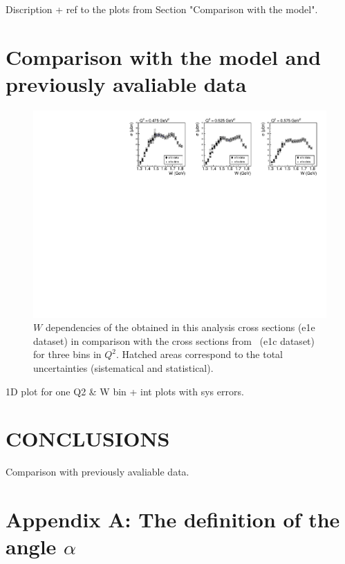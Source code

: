 \documentclass[prc,twocolumn,superscriptaddress,showpacs,amssymb,amsmath,amsfonts,linenumbers,aps]{revtex4-1}
\begin{document}
Discription + ref to the plots from Section "Comparison with the model".

\section{Comparison with the model and previously avaliable data}

\begin{figure}[htp]
\begin{center}
\includegraphics[width=12cm]{pictures/conclusions/e1e_e1c.pdf}
\caption{\small $W$ dependencies of the obtained in this analysis  cross sections (e1e dataset) in comparison with the cross sections from~\cite{Fedotov:2008aa} (e1c dataset) for three bins in $Q^{2}$. Hatched areas correspond to the total uncertainties (sistematical and statistical).}
\label{fig:e1e_e1c}
\end{center}
\end{figure}

1D plot for one Q2 \& W bin + int plots with sys errors.

\section{CONCLUSIONS}





Comparison with previously avaliable data.

\begin{acknowledgments}


\end{acknowledgments}

\clearpage
\section*{Appendix A: The definition of the angle $\alpha$}
\label{app_a}
\end{document}
